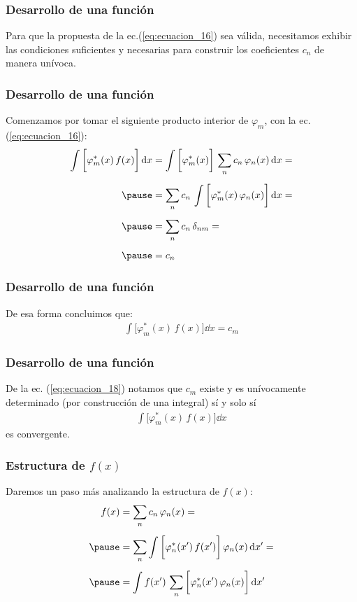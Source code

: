 \documentclass[12pt]{beamer}
\begin{document}
\begin{frame}
\frametitle{Desarrollo de una función}
Para que la propuesta de la ec.(\ref{eq:ecuacion_16}) sea válida, necesitamos exhibir las condiciones suficientes y necesarias para construir los coeficientes $c_{n}$ de manera unívoca.
\end{frame}
\begin{frame}
\frametitle{Desarrollo de una función}
Comenzamos por tomar el siguiente producto interior de $\varphi_{m}$, con la ec.(\ref{eq:ecuacion_16}):
\fontsize{12}{12}\selectfont
\begin{eqnarray}
\begin{aligned}
\int \bigg[ \varphi_{m}^{*}(x) \, f(x) \bigg] \dd{x} &= \int \bigg[ \varphi_{m}^{*} (x) \bigg] \, \sum_{n} c_{n} \, \varphi_{n} (x) \dd{x} = \\[0.5em] \pause
&= \sum_{n} c_{n} \,\int \bigg[ \varphi_{m}^{*} (x) \, \varphi_{n} (x) \bigg] \dd{x} = \\[0.5em] \pause
&= \sum_{n} c_{n} \, \delta_{nm} = \\[0.5em] \pause
&= c_{n}
\end{aligned}
\label{eq:ecuacion_17}
\end{eqnarray}
\end{frame}
\begin{frame}
\frametitle{Desarrollo de una función}
De esa forma concluimos que:
\begin{align}
\int \bigg[ \varphi_{m}^{*}(x) \, f(x) \bigg] \dd{x} = c_{m}
\label{eq:ecuacion_18}
\end{align}
\end{frame}
\begin{frame}
\frametitle{Desarrollo de una función}
De la ec. (\ref{eq:ecuacion_18}) notamos que $c_{m}$ existe y es unívocamente determinado (por construcción de una integral) sí y solo sí
\begin{align*}
\int \bigg[ \varphi_{m}^{*}(x) \, f(x) \bigg] \dd{x} 
\end{align*}
es convergente.
\end{frame}
\begin{frame}
\frametitle{Estructura de $f(x)$}
Daremos un paso más analizando la estructura de $f(x)$:
\begin{eqnarray}
\begin{aligned}
f(x) &= \sum_{n} c_{n} \, \varphi_{n}(x) = \\[0.5em] \pause
&= \sum_{n} \int \bigg[ \varphi_{n}^{*}(\ptilde{x}) \, f(\ptilde{x}) \bigg] \, \varphi_{n} (x) \dd{\ptilde{x}} = \\[0.5em] \pause
&=  \int f(\ptilde{x}) \, \sum_{n} \bigg[ \varphi_{n}^{*}(\ptilde{x}) \, \varphi_{n}(x) \bigg] \dd{\ptilde{x}}
\end{aligned}
\label{eq:ecuacion_19}
\end{eqnarray}
\end{frame}
\end{document}
